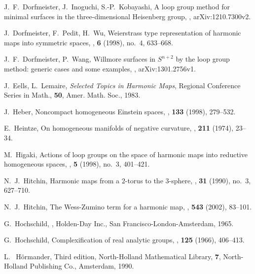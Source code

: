 \documentclass[12pt]{amsart}
\theoremstyle{definition}
\theoremstyle{remark}
\numberwithin{equation}{section}
\begin{document}
\begin{thebibliography}{10}
 J.~F.~Dorfmeister, J.~Inoguchi, S.-P.~Kobayashi,
 \newblock A loop group method for minimal surfaces in the three-dimensional Heisenberg group, 
 , arXiv:1210.7300v2.
 
 J.~Dorfmeister, F.~Pedit, H.~Wu,
 \newblock Weierstrass type representation of harmonic maps into symmetric spaces,
 , \textbf{6} (1998), no.~4, 633--668.

 J.~F.~Dorfmeister,  P.~Wang, 
 \newblock Willmore surfaces in $S^{n+2}$ by the loop group method: 
           generic cases and some examples, 
 , arXiv:1301.2756v1.

 J.~Eells, L.~Lemaire,
 \newblock \textit{Selected Topics in Harmonic Maps},
 \newblock Regional Conference Series in Math., \textbf{50}, Amer. Math. Soc., 1983. 

 J.~Heber, 
 \newblock Noncompact homogeneous Einstein spaces, 
 , \textbf{133} (1998), 279--532.

 E.~Heintze, 
 \newblock On homogeneous manifolds of negative curvature,
 , \textbf{211} (1974), 23--34.

 M.~Higaki,
 \newblock Actions of loop groups on the space of harmonic maps into
 reductive homogeneous spaces,
 , \textbf{5} (1998), 
 no.~3, 401--421.

 N.~J.~Hitchin,
 \newblock Harmonic maps from a $2$-torus to the $3$-sphere, 
 , \textbf{31} (1990), no.~3, 
 627--710.

 N.~J.~Hitchin,
 \newblock The Wess-Zumino term for a harmonic map,
 , \textbf{543} (2002), 83--101. 

 G.~Hochschild, 
 ,
 \newblock Holden-Day Inc., San Francisco-London-Amsterdam, 1965.

 G.~Hochschild, 
 \newblock Complexification of real analytic groups,
 , \textbf{125} (1966), 406--413.

 L. ~H{\"o}rmander,
  Third edition,
 \newblock North-Holland Mathematical Library, \textbf{7}, 
 North-Holland Publishing Co., Amsterdam, 1990.


\end{thebibliography}
\end{document}
